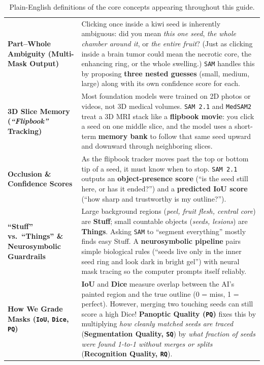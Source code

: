 \documentclass[10.5pt,a4paper]{article}
\begin{document}
\begin{table}[H]
\begin{tabularx}{\textwidth}{L{3.55cm} Y}
\textbf{Part--Whole Ambiguity (Multi-Mask Output)} & Clicking once inside a kiwi seed is inherently ambiguous: did you mean \emph{this one seed}, \emph{the whole chamber around it}, or \emph{the entire fruit}? (Just as clicking inside a brain tumor could mean the necrotic core, the enhancing ring, or the whole swelling.) \texttt{SAM} handles this by proposing \textbf{three nested guesses} (small, medium, large) along with its own confidence score for each. \\
\textbf{3D Slice Memory (\emph{``Flipbook''} Tracking)} & Most foundation models were trained on 2D photos or videos, not 3D medical volumes. \texttt{SAM 2.1} and \texttt{MedSAM2} treat a 3D MRI stack like a \textbf{flipbook movie}: you click a seed on one middle slice, and the model uses a short-term \textbf{memory bank} to follow that same seed upward and downward through neighboring slices. \\
\textbf{Occlusion \& Confidence Scores} & As the flipbook tracker moves past the top or bottom tip of a seed, it must know when to stop. \texttt{SAM 2.1} outputs an \textbf{object-presence score} (``is the seed still here, or has it ended?'') and a \textbf{predicted IoU score} (``how sharp and trustworthy is my outline?''). \\
\textbf{``Stuff'' vs.\ ``Things'' \& Neurosymbolic Guardrails} & Large background regions (\emph{peel, fruit flesh, central core}) are \textbf{Stuff}; small countable objects (\emph{seeds, lesions}) are \textbf{Things}. Asking \texttt{SAM} to ``segment everything'' mostly finds easy Stuff. A \textbf{neurosymbolic pipeline} pairs simple biological rules (``seeds live only in the inner seed ring and look dark in bright gel'') with neural mask tracing so the computer prompts itself reliably. \\
\textbf{How We Grade Masks (\texttt{IoU}, \texttt{Dice}, \texttt{PQ})} & \textbf{IoU} and \textbf{Dice} measure overlap between the AI's painted region and the true outline (0 = miss, 1 = perfect). However, merging two touching seeds can still score a high Dice! \textbf{Panoptic Quality (\texttt{PQ})} fixes this by multiplying \emph{how cleanly matched seeds are traced} (\textbf{Segmentation Quality, \texttt{SQ}}) by \emph{what fraction of seeds were found 1-to-1 without merges or splits} (\textbf{Recognition Quality, \texttt{RQ}}). \\
\bottomrule
\end{tabularx}
\caption{Plain-English definitions of the core concepts appearing throughout this guide.}
\label{tab:nontech-defs}
\end{table}
\end{document}

